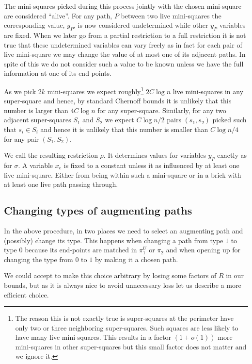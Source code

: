 \documentclass{theoretics}
\begin{document}
The mini-squares picked during this process jointly with
the chosen mini-square are considered ``alive''.
For any path, $P$ between two live mini-squares the
corresponding value, $y_P$, is now considered undetermined while other
$y_P$ variables are fixed.  When we later go from
a partial restriction to a full restriction it is not true that
these undetermined variables can vary freely as in fact for 
each pair of live mini-square we may change the value of
at most one of its adjacent paths.  In spite of this
we do not consider such a value to be known unless
we have the full information at one of its end points.


As we pick $2k$ mini-squares we
expect roughly\footnote{The reason this is not exactly true
is super-squares at the perimeter have only two or three neighboring
super-squares.  Such squares are less likely to have many live mini-squares.  
This results in a factor $(1+o(1))$ more mini-squares in
other super-squares but this small factor does not matter and
we ignore it.}
$2C \log n$ live mini-squares in any super-square and hence,
by standard Chernoff bounds it is unlikely that this number is
larger than $4C \log n$ for any super-square.
Similarly, for any two adjacent super-squares $S_1$ and $S_2$ we expect
$C \log n /2$ pairs $(s_1,s_2)$ picked such that $s_i \in S_i$
and hence it is unlikely that this number is smaller than 
$C \log n/4$ for any pair $(S_1,S_2)$.

We call the resulting restriction $\rho$.  It determines values
for variables $y_P$ exactly as for $\sigma$.  
A variable $x_e$ is fixed to a constant
unless it as influenced by at  least one live mini-square.  Either from
being within such a mini-square or in a brick with at least one
live path passing through.

\subsection{Changing types of augmenting paths} \label{sec:change}

In the above procedure, in two places we need to select
an augmenting path and (possibly) change its type.
This happens when changing a path from type $1$ to type $0$ because its end-points are matched in $\pi_1^U$
or $\pi_2$ and when opening up for changing the type from
$0$ to $1$ by making it a chosen path.

We could accept to make this choice arbitrary by losing
some factors of $R$ in our bounds, but as it is always
nice to avoid unnecessary loss let us describe a
more efficient choice.
\end{document}
